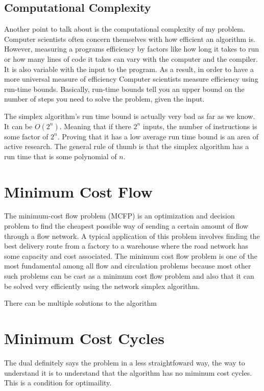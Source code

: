 \documentclass{report}
\begin{document}
\subsection{Computational Complexity}
Another point to talk about is the computational complexity of my problem. Computer scientists often concern themselves with how efficient an algorithm is. However, measuring a programs efficiency by factors like how long it takes to run or how many lines of code it takes can vary with the computer and the compiler. It is also variable with the input to the program. As a result, in order to have a more universal measure of efficiency Computer scientists measure efficiency using run-time bounds. Basically, run-time bounds tell you an upper bound on the number of steps you need to solve the problem, given the input.

The simplex algorithm's run time bound is actually very bad as far as we know. It can be $O(2^n)$. Meaning that if there $2^n$ inputs, the number of instructions is some factor of $2^n$. Proving that it has a low average run time bound is an area of active research. The general rule of thumb is that the simplex algorithm has a run time that is some polynomial of $n$.

\section{Minimum Cost Flow}

The minimum-cost flow problem (MCFP) is an optimization and decision problem to find the cheapest possible way of sending a certain amount of flow through a flow network. A typical application of this problem involves finding the best delivery route from a factory to a warehouse where the road network has some capacity and cost associated. The minimum cost flow problem is one of the most fundamental among all flow and circulation problems because most other such problems can be cast as a minimum cost flow problem and also that it can be solved very efficiently using the network simplex algorithm.

There can be multiple solutions to the algorithm


\section{Minimum Cost Cycles}

The dual definitely says the problem in a less straightfoward way, the way to understand it is to understand that the algorithm has no miminum cost cycles. This is a condition for optimaility.
\end{document}

